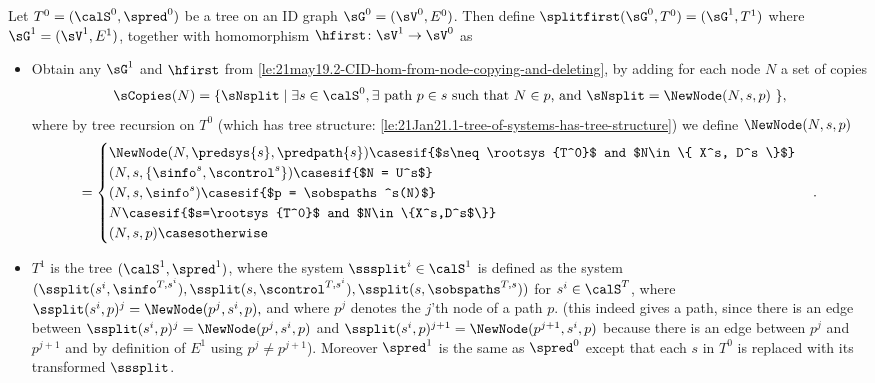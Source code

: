 \begin{definition}
\label{def:21jan25.2-first-split-to-ensure-systems-and-paths-uniqueness}
Let $T^0=(\calS^0,\spred^0)$ be a tree on an ID graph $\sG^0=(\sV^0,E^0)$. Then define $\splitfirst(\sG^0,T^0)=(\sG^1, T^1)$
where $\sG^1=(\sV^1,E^1)$, together with homomorphism $\hfirst\colon\sV^1 \to \sV^0$ as

\begin{itemize}
    \item Obtain any $\sG^1$ and $\hfirst$ from \autoref{le:21may19.2-CID-hom-from-node-copying-and-deleting}, by adding for each node $N$ a set of copies
    \[\sCopies(N) = \{\sNsplit \mid \textnormal{$\exists s\in \calS^0, \exists$ path $p \in s$ such that $N\in p$, and  $\sNsplit=\NewNode(N,s,p)$ } \},\]
    where by tree recursion on $T^0$ (which has tree structure: \autoref{le:21Jan21.1-tree-of-systems-has-tree-structure}) we define $\NewNode(N,s,p)$ \[= \begin{cases}
        \NewNode(N, \predsys{s}, \predpath{s})	\casesif {$s\neq \rootsys{T^0}$ and $N\in \{ X^s, D^s \}$}\\
        (N, s, \{\sinfo^s, \scontrol^s\}) 		\casesif {$N = U^s$}\\
        (N, s, \sinfo^s)	\casesif {$p = \sobspaths^s(N)$}\\ 
        N \casesif {$s=\rootsys{T^0}$ and $N\in\{X^s,D^s$\}}\\
        (N, s, p)			 	\casesotherwise
        \end{cases}.
    \]
    
    
    \item $T^1$ is the tree $(\calS^1,\spred^1)$, where 
    the system $\sssplit^i\in \calS^1$ is defined as the system $(\ssplit(s^i,\sinfo^{T,s^i}), \ssplit(s,\scontrol^{T,s^i}), \ssplit(s,\sobspaths^{T,s}))$ for $s^i\in \calS^T$, where 
    \(\ssplit(s^i,p)^j = \NewNode(p^j,s^i,p),\)
    and where $p^j$ denotes the $j$'th node of a path $p$. (this indeed gives a path, since there is an edge between $\ssplit(s^i,p)^j=\NewNode(p^j,s^i,p)$ and $\ssplit(s^i,p)^{j+1}=\NewNode(p^{j+1},s^i,p)$ because there is an edge between $p^j$ and $p^{j+1}$ and by definition of $E^1$ using $p^j\neq p^{j+1}$). Moreover $\spred^1$ is the same as $\spred^0$ except that each $s$ in $T^0$ is replaced with its transformed $\sssplit$.~
\end{itemize}
\end{definition}
















